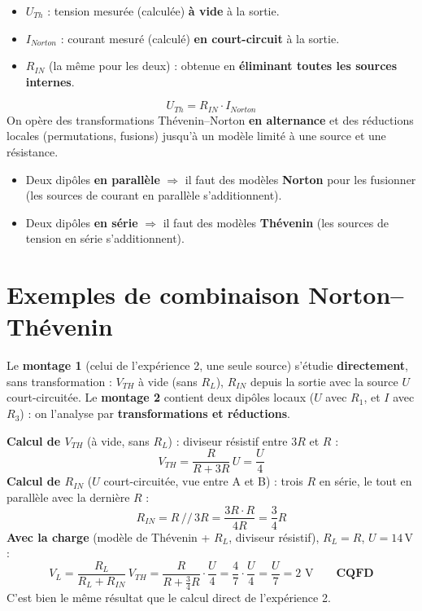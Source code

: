 \begin{thmbox}[title=Résumé Thévenin--Norton]
\begin{itemize}
  \item \textbf{$U_{Th}$} : tension mesurée (calculée) \textbf{à vide} à la sortie.
  \item \textbf{$I_{Norton}$} : courant mesuré (calculé) \textbf{en court-circuit} à la
        sortie.
  \item \textbf{$R_{IN}$} (la même pour les deux) : obtenue en \textbf{éliminant toutes les
        sources internes}.
\end{itemize}
\[ \boxed{U_{Th} = R_{IN}\cdot I_{Norton}} \]
On opère des transformations Thévenin--Norton \textbf{en alternance} et des réductions
locales (permutations, fusions) jusqu'à un modèle limité à une source et une résistance.
\end{thmbox}

\begin{propbox}[title=Les deux réflexes]
\begin{itemize}
  \item Deux dipôles \textbf{en parallèle} $\Rightarrow$ il faut des modèles
        \textbf{Norton} pour les fusionner (les sources de courant en parallèle
        s'additionnent).
  \item Deux dipôles \textbf{en série} $\Rightarrow$ il faut des modèles \textbf{Thévenin}
        (les sources de tension en série s'additionnent).
\end{itemize}
\end{propbox}

\section{Exemples de combinaison Norton--Thévenin}


Le \textbf{montage 1} (celui de l'expérience 2, une seule source) s'étudie
\textbf{directement}, sans transformation : $V_{TH}$ à vide (sans $R_L$), $R_{IN}$ depuis la
sortie avec la source $U$ court-circuitée. Le \textbf{montage 2} contient deux dipôles locaux
($U$ avec $R_1$, et $I$ avec $R_3$) : on l'analyse par \textbf{transformations et
réductions}.


\begin{exbox}[title={Montage 1 : développement complet}]
\textbf{Calcul de $V_{TH}$} (à vide, sans $R_L$) : diviseur résistif entre $3R$ et $R$ :
\[ V_{TH} = \frac{R}{R + 3R}\,U = \frac U4 \]
\textbf{Calcul de $R_{IN}$} ($U$ court-circuitée, vue entre A et B) : trois $R$ en série, le
tout en parallèle avec la dernière $R$ :
\[ R_{IN} = R\,/\!/\,3R = \frac{3R\cdot R}{4R} = \frac34 R \]
\textbf{Avec la charge} (modèle de Thévenin + $R_L$, diviseur résistif), $R_L = R$,
$U = 14$\,V :
\[ V_L = \frac{R_L}{R_L + R_{IN}}\,V_{TH} = \frac{R}{R + \frac34 R}\cdot\frac U4
       = \frac47\cdot\frac U4 = \frac U7 = 2\text{ V} \qquad\textbf{CQFD} \]
C'est bien le même résultat que le calcul direct de l'expérience 2.
\end{exbox}

